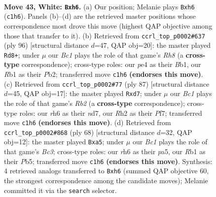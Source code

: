 \documentclass[11pt]{article}
\begin{document}
\clearpage

\begin{figure}[p]\centering
\begin{subfigure}{0.46\textwidth}\centering
\resizebox{\linewidth}{!}{%
\newchessgame
\chessboard[
  setfen={7k/5pr1/5n1r/8/p3p2p/3p3P/PP3P1R/1RB1K3 w - - 26 43},
  showmover=false,
  pgfstyle=straightmove, color=movearrow, markmove={c1-h6}
]}
\caption{}
\end{subfigure}\hfill
\begin{subfigure}{0.46\textwidth}\centering
\resizebox{\linewidth}{!}{%
\newchessgame
\chessboard[
  setfen={7R/p3r2p/1p1k2p1/3r1nP1/P5RP/8/KP6/1B6 w - - 25 49},
  showmover=false,
  pgfstyle=straightmove, color=movearrow, markmove={h8-d8}
]}
\caption{}
\end{subfigure}
\\[4pt]
\begin{subfigure}{0.46\textwidth}\centering
\resizebox{\linewidth}{!}{%
\newchessgame
\chessboard[
  setfen={8/rr1N1pk1/4p3/p1R3P1/P2R1P2/1p6/1P3K2/8 b - - 0 44},
  showmover=false,
  pgfstyle=straightmove, color=movearrow, markmove={b7-d7}
]}
\caption{}
\end{subfigure}\hfill
\begin{subfigure}{0.46\textwidth}\centering
\resizebox{\linewidth}{!}{%
\newchessgame
\chessboard[
  setfen={1r1r2k1/5pp1/1n4p1/pP6/2pP3P/2B2P2/2R3P1/1R4K1 w - - 2 35},
  showmover=false,
  pgfstyle=straightmove, color=movearrow, markmove={c3-a5}
]}
\caption{}
\end{subfigure}
\caption{\textbf{Move 43, White: \texttt{Bxh6}.} (a) Our position; Melanie plays \texttt{Bxh6} (\texttt{c1h6}). Panels (b)--(d) are the retrieved master positions whose correspondence most drove this move (highest QAP objective among those that transfer to it). (b) Retrieved from \texttt{ccrl\_top\_p0002\#637} (ply 96) [structural distance $d$=47, QAP obj=20]: the master played \texttt{Rd8+}; under $\mu$ our \emph{Bc1} plays the role of that game's \emph{Rh8} (a \textbf{cross-type} correspondence); cross-type roles: our \emph{p}e4 as their \emph{B}b1, our \emph{R}b1 as their \emph{P}b2; transferred move \texttt{c1h6} \textbf{(endorses this move)}. (c) Retrieved from \texttt{ccrl\_top\_p0002\#77} (ply 87) [structural distance $d$=45, QAP obj=17]: the master played \texttt{Rxd7}; under $\mu$ our \emph{Bc1} plays the role of that game's \emph{Rb2} (a \textbf{cross-type} correspondence); cross-type roles: our \emph{r}h6 as their \emph{n}d7, our \emph{R}h2 as their \emph{P}f7; transferred move \texttt{c1h6} \textbf{(endorses this move)}. (d) Retrieved from \texttt{ccrl\_top\_p0002\#868} (ply 68) [structural distance $d$=32, QAP obj=12]: the master played \texttt{Bxa5}; under $\mu$ our \emph{Bc1} plays the role of that game's \emph{Bc3}; cross-type roles: our \emph{r}h6 as their \emph{p}a5, our \emph{R}b1 as their \emph{P}b5; transferred move \texttt{c1h6} \textbf{(endorses this move)}. Synthesis: 4 retrieved analogs transferred to \texttt{Bxh6} (summed QAP objective 60, the strongest correspondence among the candidate moves); Melanie committed it via the \texttt{search} selector.}
\label{fig:thought-m84}
\end{figure}
\end{document}

